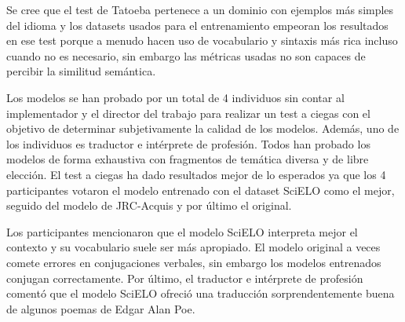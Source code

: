 Se cree que el test de Tatoeba pertenece a un dominio con ejemplos más simples del idioma y los datasets usados para el entrenamiento empeoran los resultados en ese test porque a menudo hacen uso de vocabulario y sintaxis más rica incluso cuando no es necesario, sin embargo las métricas usadas no son capaces de percibir la similitud semántica.

Los modelos se han probado por un total de 4 individuos sin contar al implementador y el director del trabajo para realizar un test a ciegas con el objetivo de determinar subjetivamente la calidad de los modelos. Además, uno de los individuos es traductor e intérprete de profesión. Todos han probado los modelos de forma exhaustiva con fragmentos de temática diversa y de libre elección.
El test a ciegas ha dado resultados mejor de lo esperados ya que los 4 participantes votaron el modelo entrenado con el dataset SciELO como el mejor, seguido del modelo de JRC-Acquis y por último el original.

Los participantes mencionaron que el modelo SciELO interpreta mejor el contexto y su vocabulario suele ser más apropiado. El modelo original a veces comete errores en conjugaciones verbales, sin embargo los modelos entrenados conjugan correctamente. Por último, el traductor e intérprete de profesión comentó que el modelo SciELO ofreció una traducción sorprendentemente buena de algunos poemas de Edgar Alan Poe.

